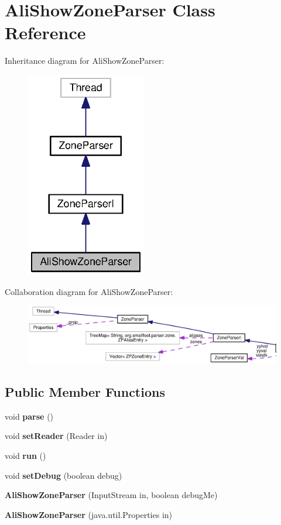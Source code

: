 \section{Ali\+Show\+Zone\+Parser Class Reference}
\label{classorg_1_1smallfoot_1_1parser_1_1zone_1_1AliShowZoneParser}


Inheritance diagram for Ali\+Show\+Zone\+Parser\+:\nopagebreak
\begin{figure}[H]
\begin{center}
\leavevmode
\includegraphics[width=148pt]{classorg_1_1smallfoot_1_1parser_1_1zone_1_1AliShowZoneParser__inherit__graph}
\end{center}
\end{figure}


Collaboration diagram for Ali\+Show\+Zone\+Parser\+:\nopagebreak
\begin{figure}[H]
\begin{center}
\leavevmode
\includegraphics[width=350pt]{classorg_1_1smallfoot_1_1parser_1_1zone_1_1AliShowZoneParser__coll__graph}
\end{center}
\end{figure}
\subsection*{Public Member Functions}
\begin{DoxyCompactItemize}
\item 
void {\bf parse} ()
\item 
void {\bf set\+Reader} (Reader in)
\item 
void {\bf run} ()
\item 
void {\bf set\+Debug} (boolean debug)
\item 
{\bf Ali\+Show\+Zone\+Parser} (Input\+Stream in, boolean debug\+Me)
\item 
{\bf Ali\+Show\+Zone\+Parser} (java.\+util.\+Properties in)
\end{DoxyCompactItemize}
